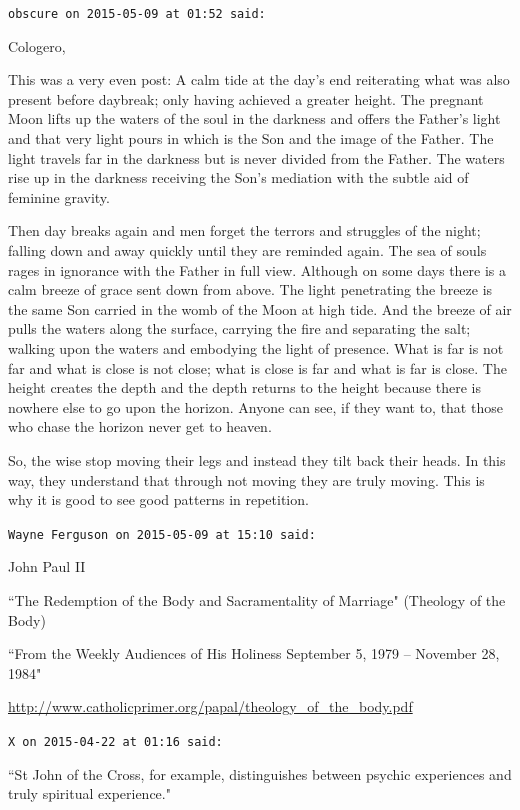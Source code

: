 \begin{footnotesize}
\begin{sffamily}
\texttt{obscure on 2015-05-09 at 01:52 said: }

Cologero,

This was a very even post: A calm tide at the day's end reiterating what was also present before daybreak; only having achieved a greater height. The pregnant Moon lifts up the waters of the soul in the darkness and offers the Father's light and that very light pours in which is the Son and the image of the Father. The light travels far in the darkness but is never divided from the Father. The waters rise up in the darkness receiving the Son's mediation with the subtle aid of feminine gravity.

Then day breaks again and men forget the terrors and struggles of the night; falling down and away quickly until they are reminded again. The sea of souls rages in ignorance with the Father in full view. Although on some days there is a calm breeze of grace sent down from above. The light penetrating the breeze is the same Son carried in the womb of the Moon at high tide. And the breeze of air pulls the waters along the surface, carrying the fire and separating the salt; walking upon the waters and embodying the light of presence. What is far is not far and what is close is not close; what is close is far and what is far is close. The height creates the depth and the depth returns to the height because there is nowhere else to go upon the horizon. Anyone can see, if they want to, that those who chase the horizon never get to heaven. 

So, the wise stop moving their legs and instead they tilt back their heads. In this way, they understand that through not moving they are truly moving. This is why it is good to see good patterns in repetition.


\hfill

\texttt{Wayne Ferguson on 2015-05-09 at 15:10 said: }

John Paul II

``The Redemption of the Body and Sacramentality of Marriage" (Theology of the Body) 

``From the Weekly Audiences of His Holiness September 5, 1979 – November 28, 1984" 

\url{http://www.catholicprimer.org/papal/theology\_of\_the\_body.pdf}


\hfill

\texttt{X on 2015-04-22 at 01:16 said: }

``St John of the Cross, for example, distinguishes between psychic experiences and truly spiritual experience." 


\end{sffamily}
\end{footnotesize}
